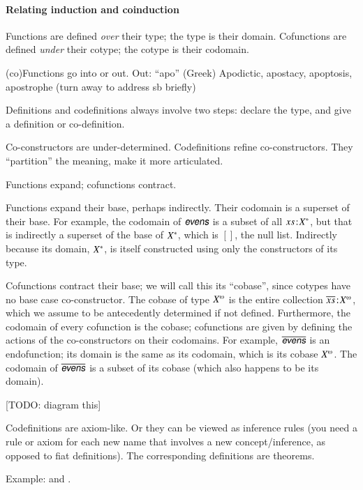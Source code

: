 \documentclass{article}
\begin{document}
\paragraph{Relating induction and coinduction}

Functions are defined \textit{over} their type; the type is their
domain. Cofunctions are defined \textit{under} their cotype; the
cotype is their codomain.

(co)Functions go into or out. Out: ``apo'' (Greek) Apodictic,
apostacy, apoptosis, apostrophe (turn away to address sb briefly)

Definitions and codefinitions always involve two steps: declare the
type, and give a definition or co-definition.

Co-constructors are under-determined. Codefinitions refine
co-constructors. They ``partition'' the meaning, make it more
articulated.

Functions expand; cofunctions contract.

Functions expand their base, perhaps indirectly. Their codomain is a
superset of their base. For example, the codomain of \(\defn{evens}\)
is a subset of all \({xs}\hspace{1pt}\mathpunct{:}\hspace{-1pt}{X^{*}}\), but that is indirectly
a superset of the base of \({X^{*}}\), which is \([]\), the null
list. Indirectly because its domain, \({X^{*}}\), is itself
constructed using only the constructors of its type.

Cofunctions contract their base; we will call this its ``cobase'',
since cotypes have no base case co-constructor. The cobase of type
\(\colist{X}\) is the entire collection
\(\tj{\coseq{x}}{\colist{X}}\), which we assume to be antecedently
determined if not defined. Furthermore, the codomain of every
cofunction is the cobase; cofunctions are given by defining the
actions of the co-constructors on their codomains. For example,
\(\codefn{evens}\) is an endofunction; its domain is the same as its
codomain, which is its cobase \(\colist{X}\). The codomain of
\(\codefn{evens}\) is a subset of its cobase (which also happens to be
its domain).

[TODO: diagram this]


Codefinitions are axiom-like. Or they can be viewed as inference rules
(you need a rule or axiom for each new name that involves a new
concept/inference, as opposed to fiat definitions). The corresponding
definitions are theorems.

Example:  and .
\end{document}
